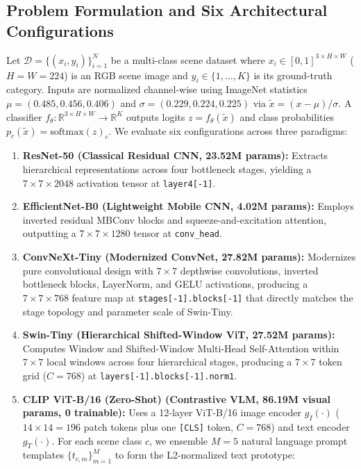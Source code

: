 \documentclass[final,5p,times,twocolumn]{elsarticle}
\begin{document}
\subsection{Problem Formulation and Six Architectural Configurations}
Let $\mathcal{D} = \{(x_i, y_i)\}_{i=1}^{N}$ be a multi-class scene dataset where $x_i \in [0, 1]^{3 \times H \times W}$ ($H=W=224$) is an RGB scene image and $y_i \in \{1, \dots, K\}$ is its ground-truth category. Inputs are normalized channel-wise using ImageNet statistics $\mu = (0.485, 0.456, 0.406)$ and $\sigma = (0.229, 0.224, 0.225)$ via $\tilde{x} = (x - \mu) / \sigma$. A classifier $f_\theta: \mathbb{R}^{3 \times H \times W} \to \mathbb{R}^K$ outputs logits $z = f_\theta(\tilde{x})$ and class probabilities $p_c(\tilde{x}) = \text{softmax}(z)_c$. We evaluate six configurations across three paradigms:
\begin{enumerate}
    \item \textbf{ResNet-50 \cite{he2016deep} (Classical Residual CNN, 23.52M params):} Extracts hierarchical representations across four bottleneck stages, yielding a $7\times7\times2048$ activation tensor at \texttt{layer4[-1]}.
    \item \textbf{EfficientNet-B0 \cite{tan2019efficientnet} (Lightweight Mobile CNN, 4.02M params):} Employs inverted residual MBConv blocks and squeeze-and-excitation attention, outputting a $7\times7\times1280$ tensor at \texttt{conv\_head}.
    \item \textbf{ConvNeXt-Tiny \cite{liu2022convnet} (Modernized ConvNet, 27.82M params):} Modernizes pure convolutional design with $7\times7$ depthwise convolutions, inverted bottleneck blocks, LayerNorm, and GELU activations, producing a $7\times7\times768$ feature map at \texttt{stages[-1].blocks[-1]} that directly matches the stage topology and parameter scale of Swin-Tiny.
    \item \textbf{Swin-Tiny \cite{liu2021swin} (Hierarchical Shifted-Window ViT, 27.52M params):} Computes Window and Shifted-Window Multi-Head Self-Attention within $7\times7$ local windows across four hierarchical stages, producing a $7\times7$ token grid ($C=768$) at \texttt{layers[-1].blocks[-1].norm1}.
    \item \textbf{CLIP ViT-B/16 (Zero-Shot) \cite{radford2021learning} (Contrastive VLM, 86.19M visual params, 0 trainable):} Uses a 12-layer ViT-B/16 image encoder $g_I(\cdot)$ ($14\times14 = 196$ patch tokens plus one \texttt{[CLS]} token, $C=768$) and text encoder $g_T(\cdot)$. For each scene class $c$, we ensemble $M=5$ natural language prompt templates $\{t_{c,m}\}_{m=1}^M$ to form the L2-normalized text prototype:

\end{enumerate}
\end{document}
